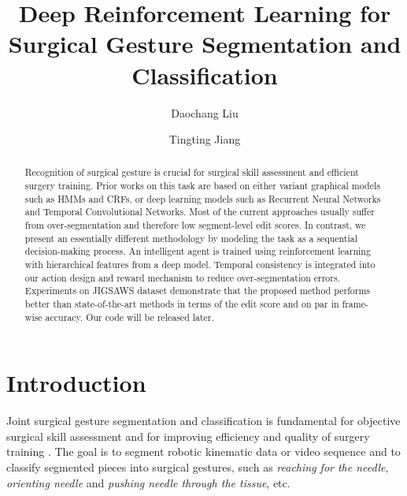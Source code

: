 \documentclass{llncs}
\begin{document}
\mainmatter              \title{Deep Reinforcement Learning for Surgical Gesture Segmentation and Classification}
\author{Daochang Liu \and Tingting Jiang}
\maketitle              
\begin{abstract}
Recognition of surgical gesture is crucial for surgical skill assessment and efficient surgery training. Prior works on this task are based on either variant graphical models such as HMMs and CRFs, or deep learning models such as Recurrent Neural Networks and Temporal Convolutional Networks. Most of the current approaches usually suffer from over-segmentation and therefore low segment-level edit scores. In contrast, we present an essentially different methodology by modeling the task as a sequential decision-making process. An intelligent agent is trained using reinforcement learning with hierarchical features from a deep model. Temporal consistency is integrated into our action design and reward mechanism to reduce over-segmentation errors. Experiments on JIGSAWS dataset demonstrate that the proposed method performs better than state-of-the-art methods in terms of the edit score and on par in frame-wise accuracy. Our code will be released later.
\end{abstract}
\section{Introduction}
Joint surgical gesture segmentation and classification is fundamental for objective surgical skill assessment and for improving efficiency and quality of surgery training \cite{ahmidi2017dataset}. The goal is to segment robotic kinematic data or video sequence and to classify segmented pieces into surgical gestures, such as {\itshape reaching for the needle}, {\itshape orienting needle} and {\itshape pushing needle through the tissue}, etc.
\end{document}

